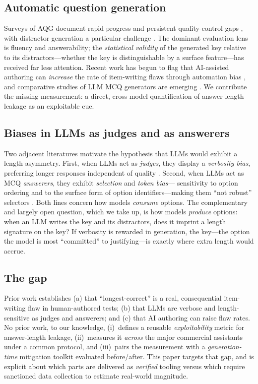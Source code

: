 \documentclass[10pt,twocolumn]{article}
\begin{document}
\subsection{Automatic question generation}
Surveys of AQG document rapid progress and persistent quality-control gaps
\citep{kurdi2020systematic}, with distractor generation a particular
challenge \citep{awalurahman2024distractor,qiu2020automatic}. The dominant
evaluation lens is fluency and answerability; the \emph{statistical validity}
of the generated key relative to its distractors---whether the key is
distinguishable by a surface feature---has received far less attention. Recent
work has begun to flag that AI-assisted authoring can \emph{increase} the rate
of item-writing flaws through automation bias
\citep{frontiers2026automation,an2026orchestrating}, and comparative studies of LLM
MCQ generators are emerging \citep{comparativeMCQ2025,benchmarker2026}. We
contribute the missing measurement: a direct, cross-model quantification of
answer-length leakage as an exploitable cue.

\subsection{Biases in LLMs as judges and as answerers}
Two adjacent literatures motivate the hypothesis that LLMs would exhibit a
length asymmetry. First, when LLMs act as \emph{judges}, they display a
\emph{verbosity bias}, preferring longer responses independent of quality
\citep{zheng2023judging,saito2023verbosity}. Second, when LLMs act as MCQ
\emph{answerers}, they exhibit \emph{selection} and \emph{token bias}---
sensitivity to option ordering and to the surface form of option
identifiers---making them ``not robust'' selectors
\citep{zheng2024robust,wang2024lookatthetext}. Both lines concern how models
\emph{consume} options. The complementary and largely open question, which we
take up, is how models \emph{produce} options: when an LLM writes the key and
its distractors, does it imprint a length signature on the key? If verbosity is
rewarded in generation, the key---the option the model is most ``committed''
to justifying---is exactly where extra length would accrue.

\subsection{The gap}
Prior work establishes (a) that ``longest-correct'' is a real, consequential
item-writing flaw in human-authored tests; (b) that LLMs are verbose and
length-sensitive as judges and answerers; and (c) that AI authoring can raise
flaw rates. No prior work, to our knowledge, (i)~defines a reusable
\emph{exploitability} metric for answer-length leakage, (ii)~measures it
\emph{across} the major commercial assistants under a common protocol, and
(iii)~pairs the measurement with a \emph{generation-time} mitigation toolkit
evaluated before/after. This paper targets that gap, and is explicit about
which parts are delivered as \emph{verified} tooling versus which require
sanctioned data collection to estimate real-world magnitude.
\end{document}
